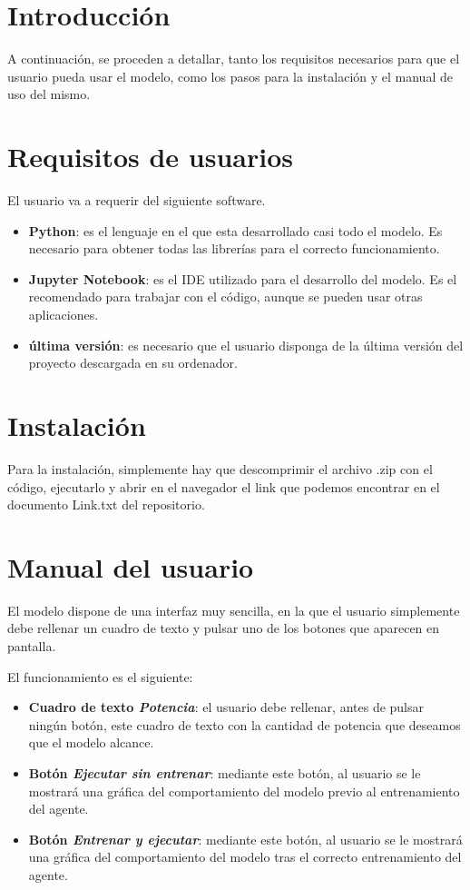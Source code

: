 
\section{Introducción}

A continuación, se proceden a detallar, tanto los requisitos necesarios para que el usuario pueda usar el modelo, como los pasos para la instalación y el manual de uso del mismo.


\section{Requisitos de usuarios}

El usuario va a requerir del siguiente software.

\begin{itemize}
    \item \textbf{Python}: es el lenguaje en el que esta desarrollado casi todo el modelo. Es necesario para obtener todas las librerías para el correcto funcionamiento.
    \item \textbf{Jupyter Notebook}: es el IDE utilizado para el desarrollo del modelo. Es el recomendado para trabajar con el código, aunque se pueden usar otras aplicaciones.
    \item \textbf{última versión}: es necesario que el usuario disponga de la última versión del proyecto descargada en su ordenador.
\end{itemize}


\section{Instalación}

Para la instalación, simplemente hay que descomprimir el archivo .zip con el código, ejecutarlo y abrir en el navegador el link que podemos encontrar en el documento Link.txt del repositorio.


\section{Manual del usuario}

El modelo dispone de una interfaz muy sencilla, en la que el usuario simplemente debe rellenar un cuadro de texto y pulsar uno de los botones que aparecen en pantalla.

El funcionamiento es el siguiente:
\begin{itemize}
    \item \textbf{Cuadro de texto \textit{Potencia}}: el usuario debe rellenar, antes de pulsar ningún botón, este cuadro de texto con la cantidad de potencia que deseamos que el modelo alcance.
    \item \textbf{Botón \textit{Ejecutar sin entrenar}}: mediante este botón, al usuario se le mostrará una gráfica del comportamiento del modelo previo al entrenamiento del agente.
    \item \textbf{Botón \textit{Entrenar y ejecutar}}: mediante este botón, al usuario se le mostrará una gráfica del comportamiento del modelo tras el correcto entrenamiento del agente.
\end{itemize}

